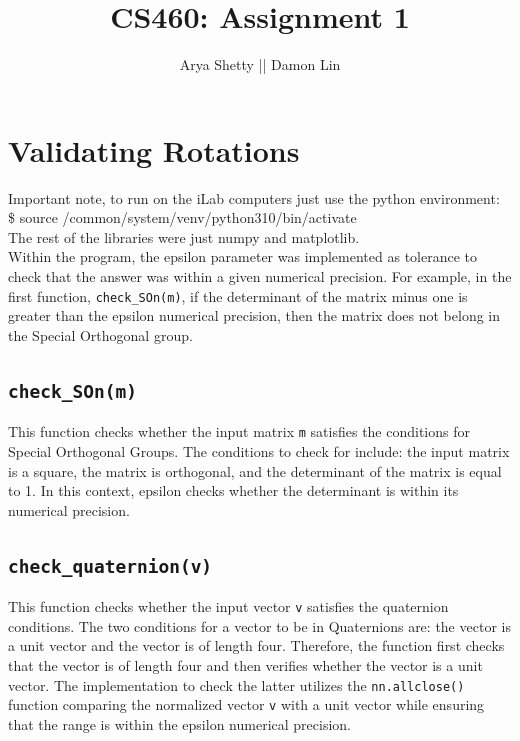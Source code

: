 \documentclass{article}
\title{CS460: Assignment 1}
\author{Arya Shetty || Damon Lin}
\begin{document}
\maketitle

\section{Validating Rotations}

Important note, to run on the iLab computers just use the python environment: \\
\$ source /common/system/venv/python310/bin/activate \\
The rest of the libraries were just numpy and matplotlib.\\
Within the program, the epsilon parameter was implemented as tolerance to check that the answer was within a given numerical precision. For example, in the first function, \texttt{check\_SOn(m)}, if the determinant of the matrix minus one is greater than the epsilon numerical precision, then the matrix does not belong in the Special Orthogonal group.

\subsection{\texttt{check\_SOn(m)}}

This function checks whether the input matrix \texttt{m} satisfies the conditions for Special Orthogonal Groups. The conditions to check for include: the input matrix is a square, the matrix is orthogonal, and the determinant of the matrix is equal to 1. In this context, epsilon checks whether the determinant is within its numerical precision.

\subsection{\texttt{check\_quaternion(v)}}

This function checks whether the input vector \texttt{v} satisfies the quaternion conditions. The two conditions for a vector to be in Quaternions are: the vector is a unit vector and the vector is of length four. Therefore, the function first checks that the vector is of length four and then verifies whether the vector is a unit vector. The implementation to check the latter utilizes the \texttt{nn.allclose()} function comparing the normalized vector \texttt{v} with a unit vector while ensuring that the range is within the epsilon numerical precision.
\end{document}
